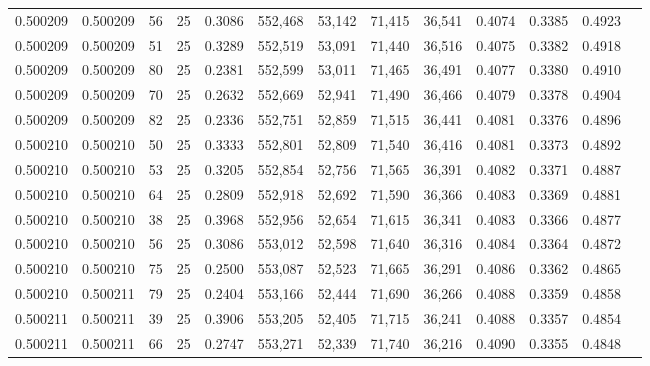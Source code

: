 \begin{tabular}{rrrrrrrrrrrrr}
0.500209 & 0.500209 &    56 &  25 &                                     0.3086 & 552,468 &  53,142 &  71,415 &  36,541 & 0.4074 & 0.3385 & 0.4923 \\
0.500209 & 0.500209 &    51 &  25 &                                     0.3289 & 552,519 &  53,091 &  71,440 &  36,516 & 0.4075 & 0.3382 & 0.4918 \\
0.500209 & 0.500209 &    80 &  25 &                                     0.2381 & 552,599 &  53,011 &  71,465 &  36,491 & 0.4077 & 0.3380 & 0.4910 \\
0.500209 & 0.500209 &    70 &  25 &                                     0.2632 & 552,669 &  52,941 &  71,490 &  36,466 & 0.4079 & 0.3378 & 0.4904 \\
0.500209 & 0.500209 &    82 &  25 &                                     0.2336 & 552,751 &  52,859 &  71,515 &  36,441 & 0.4081 & 0.3376 & 0.4896 \\
0.500210 & 0.500210 &    50 &  25 &                                     0.3333 & 552,801 &  52,809 &  71,540 &  36,416 & 0.4081 & 0.3373 & 0.4892 \\
0.500210 & 0.500210 &    53 &  25 &                                     0.3205 & 552,854 &  52,756 &  71,565 &  36,391 & 0.4082 & 0.3371 & 0.4887 \\
0.500210 & 0.500210 &    64 &  25 &                                     0.2809 & 552,918 &  52,692 &  71,590 &  36,366 & 0.4083 & 0.3369 & 0.4881 \\
0.500210 & 0.500210 &    38 &  25 &                                     0.3968 & 552,956 &  52,654 &  71,615 &  36,341 & 0.4083 & 0.3366 & 0.4877 \\
0.500210 & 0.500210 &    56 &  25 &                                     0.3086 & 553,012 &  52,598 &  71,640 &  36,316 & 0.4084 & 0.3364 & 0.4872 \\
0.500210 & 0.500210 &    75 &  25 &                                     0.2500 & 553,087 &  52,523 &  71,665 &  36,291 & 0.4086 & 0.3362 & 0.4865 \\
0.500210 & 0.500211 &    79 &  25 &                                     0.2404 & 553,166 &  52,444 &  71,690 &  36,266 & 0.4088 & 0.3359 & 0.4858 \\
0.500211 & 0.500211 &    39 &  25 &                                     0.3906 & 553,205 &  52,405 &  71,715 &  36,241 & 0.4088 & 0.3357 & 0.4854 \\
0.500211 & 0.500211 &    66 &  25 &                                     0.2747 & 553,271 &  52,339 &  71,740 &  36,216 & 0.4090 & 0.3355 & 0.4848 \\

\end{tabular}
